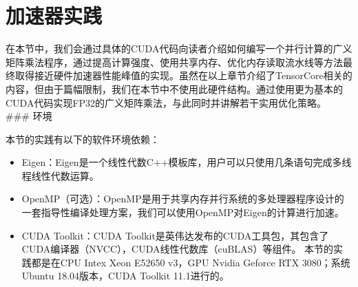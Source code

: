 \documentclass[letterpaper,10pt,english]{sphinxmanual}
\begin{document}
\section{加速器实践}
\label{\detokenize{chapter_accelerator/accelerator_practise:id1}}\label{\detokenize{chapter_accelerator/accelerator_practise::doc}}
\sphinxAtStartPar
在本节中，我们会通过具体的CUDA代码向读者介绍如何编写一个并行计算的广义矩阵乘法程序，通过提高计算强度、使用共享内存、优化内存读取流水线等方法最终取得接近硬件加速器性能峰值的实现。虽然在以上章节介绍了TensorCore相关的内容，但由于篇幅限制，我们在本节中不使用此硬件结构。通过使用更为基本的CUDA代码实现FP32的广义矩阵乘法，与此同时并讲解若干实用优化策略。
\#\#\# 环境

\sphinxAtStartPar
本节的实践有以下的软件环境依赖：
\begin{itemize}
\item {} 
\sphinxAtStartPar
Eigen：Eigen是一个线性代数C++模板库，用户可以只使用几条语句完成多线程线性代数运算。

\item {} 
\sphinxAtStartPar
OpenMP（可选）：OpenMP是用于共享内存并行系统的多处理器程序设计的一套指导性编译处理方案，我们可以使用OpenMP对Eigen的计算进行加速。

\item {} 
\sphinxAtStartPar
CUDA Toolkit：CUDA
Toolkit是英伟达发布的CUDA工具包，其包含了CUDA编译器（NVCC），CUDA线性代数库（cuBLAS）等组件。
本节的实践都是在CPU Intex Xeon E5\sphinxhyphen{}2650 v3，GPU Nvidia Geforce RTX
3080；系统Ubuntu 18.04版本，CUDA Toolkit 11.1进行的。

\end{itemize}
\end{document}
